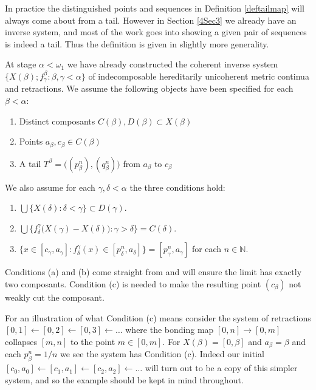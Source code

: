 \documentclass[12pt]{article}
\theoremstyle{plain}
\theoremstyle{definition}
\newcommand{\A}{\ensuremath{\alpha}}
\newcommand{\B}{\ensuremath{\beta}}
\newcommand{\W}{\ensuremath{\omega}}
\newcommand{\G}{\ensuremath{\gamma}}
\newcommand{\D}{\ensuremath{\delta}}
\newcommand{\NN}{\ensuremath{\mathbb N}}
\newcommand{\0}{\ensuremath{\varnothing}}
\begin{document}
	In practice the distinguished points and sequences in Definition \ref{deftailmap} will always come about from a tail. However in Section \ref{4Sec3} we already have an inverse system, and most of the work goes into showing a given pair of sequences is indeed a tail. Thus the definition is given in slightly more generality.
	
	At stage $\A < \W_1$ we have already constructed the coherent inverse system \mbox{$\{X(\B);f^\B_\G: \B,\G < \A\}$} of indecomposable hereditarily unicoherent metric continua and retractions. We assume the following objects have been specified for each $\B < \A$:
	
	
	\begin{enumerate}[label=(\roman*)]
		\item Distinct composants $C(\B), D(\B) \subset X(\B)$
		\item Points $a_\B,c_\B \in C(\B)$
		\item A tail $T^\B = \big ( (p^n_\B),(q^n_\B) \big )$ from $a_\B$ to $c_\B$
	\end{enumerate}
	
	We also assume for each $\G,\D < \A$ the three conditions hold:
	
	\begin{enumerate}[label=(\alph*)]
		\item $\bigcup  \big \{X(\D): \D < \G \big \} \subset D(\G)$. 
		\item $\bigcup  \big \{f^\G_\D \big (X(\G) - X(\D) \big ): \G > \D \big \} = C(\D)$.
		\item $\big \{x \in [c_\G,a_\G]: f^\G_\D(x) \in [p^n_\D,a_\D] \big \}= [p^n_\G,a_\G]$ for each $n \in \NN$.
	\end{enumerate}
	
	
	Conditions (a) and (b) come straight from \cite{one} and will ensure the limit has exactly two composants.
	Condition (c) is needed to make the resulting point $(c_\B)$ not weakly cut the composant. 
	
	For an illustration of what Condition (c) means consider the system of retractions $ [0,1] \leftarrow [0,2] \leftarrow [0,3] \leftarrow \ldots$ where the bonding map $[0,n] \to [0,m]$ collapses $[m,n]$ to the point $m \in [0,m]$. For $X(\B) = [0,\B]$ and $a_\B = \B$ and each $p^n_\B = 1/n$ we see the system has Condition (c). 
	Indeed our initial $ [c_0,a_0] \leftarrow [c_1,a_1]  \leftarrow [c_2,a_2] \leftarrow \ldots$ will turn out to be a copy of this simpler system, and so the example should be kept in mind throughout.
	
\end{document}
